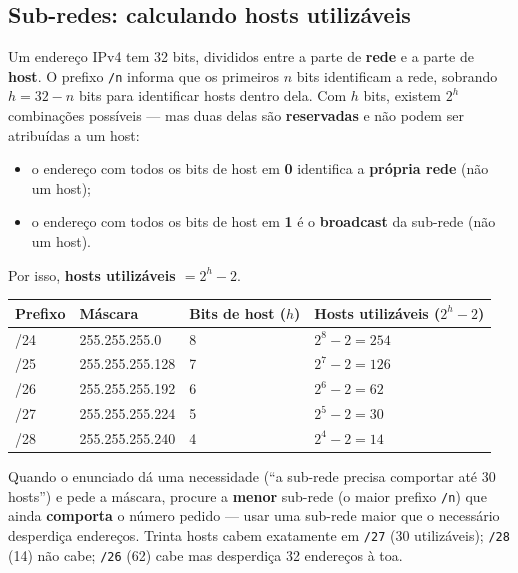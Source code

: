 \subsection{Sub-redes: calculando hosts utilizáveis}

\begin{conceito}
Um endereço IPv4 tem 32 bits, divididos entre a parte de \textbf{rede} e a
parte de \textbf{host}. O prefixo \texttt{/n} informa que os primeiros $n$
bits identificam a rede, sobrando $h = 32 - n$ bits para identificar hosts
dentro dela. Com $h$ bits, existem $2^h$ combinações possíveis --- mas duas
delas são \textbf{reservadas} e não podem ser atribuídas a um host:

\begin{itemize}
\item o endereço com todos os bits de host em \textbf{0} identifica a
\textbf{própria rede} (não um host);
\item o endereço com todos os bits de host em \textbf{1} é o
\textbf{broadcast} da sub-rede (não um host).
\end{itemize}

Por isso, \textbf{hosts utilizáveis $= 2^h - 2$}.
\end{conceito}

\begin{exemplo}
\begin{center}
\begin{tabular}{@{}p{1.6cm}p{3.6cm}p{2.2cm}p{3.4cm}@{}}
\toprule
\textbf{Prefixo} & \textbf{Máscara} & \textbf{Bits de host ($h$)} & \textbf{Hosts utilizáveis ($2^h{-}2$)} \\
\midrule
/24 & 255.255.255.0 & 8 & $2^8-2=254$ \\
/25 & 255.255.255.128 & 7 & $2^7-2=126$ \\
/26 & 255.255.255.192 & 6 & $2^6-2=62$ \\
/27 & 255.255.255.224 & 5 & $2^5-2=30$ \\
/28 & 255.255.255.240 & 4 & $2^4-2=14$ \\
\bottomrule
\end{tabular}
\end{center}
\end{exemplo}

\begin{regrapratica}
Quando o enunciado dá uma necessidade (“a sub-rede precisa comportar até 30
hosts”) e pede a máscara, procure a \textbf{menor} sub-rede (o maior
prefixo \texttt{/n}) que ainda \textbf{comporta} o número pedido --- usar
uma sub-rede maior que o necessário desperdiça endereços. Trinta hosts
cabem exatamente em \texttt{/27} (30 utilizáveis); \texttt{/28} (14) não
cabe; \texttt{/26} (62) cabe mas desperdiça 32 endereços à toa.
\end{regrapratica}

